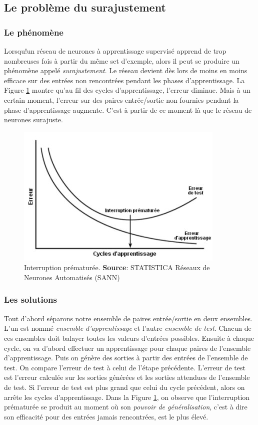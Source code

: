 \subsection{Le problème du surajustement}
\subsubsection{Le phénomène}
Lorsqu!un réseau de neurones à apprentissage supervisé apprend de trop nombreuses fois à partir du même set d'exemple, alors il peut se produire un phénomène appelé \emph{surajustement}\cite{statistica}.
Le réseau devient dès lors de moins en moins efficace sur des entrées non rencontrées pendant les phases d'apprentissage.
La Figure \ref{interruption} montre qu'au fil des cycles d'apprentissage, l'erreur diminue.
Mais à un certain moment, l'erreur sur des paires entrée/sortie non fournies pendant la phase d'apprentissage augmente. 
C'est à partir de ce moment là que le réseau de neurones surajuste.
\begin{figure}
 \centering
 \includegraphics[scale=0.6]{../figures/surgeneralisation.jpg}
 \caption{Interruption prématurée. \textbf{Source}: STATISTICA Réseaux de Neurones Automatisés (SANN)\cite{statistica}}
 \label{interruption}
\end{figure}
\subsubsection{Les solutions}
Tout d'abord séparons notre ensemble de paires entrée/sortie en deux ensembles.
L'un est nommé \emph{ensemble d'apprentissage} et l'autre \emph{ensemble de test}.
Chacun de ces ensembles doit balayer toutes les valeurs d'entrées possibles.
Ensuite à chaque cycle, on va d'abord effectuer un apprentissage pour chaque paires de l'ensemble d'apprentissage.
Puis on génère des sorties à partir des entrées de l'ensemble de test.
On compare l'erreur de test à celui de l'étape précédente.
L'erreur de test est l'erreur calculée sur les sorties générées et les sorties attendues de l'ensemble de test.
Si l'erreur de test est plus grand que celui du cycle précédent, alors on arrête les cycles d'apprentissage.
Dans la Figure \ref{interruption}, on observe que l'interruption prématurée se produit au moment où son \emph{pouvoir de généralisation}, c'est à dire son efficacité pour des entrées jamais rencontrées, est le plus élevé.\\

